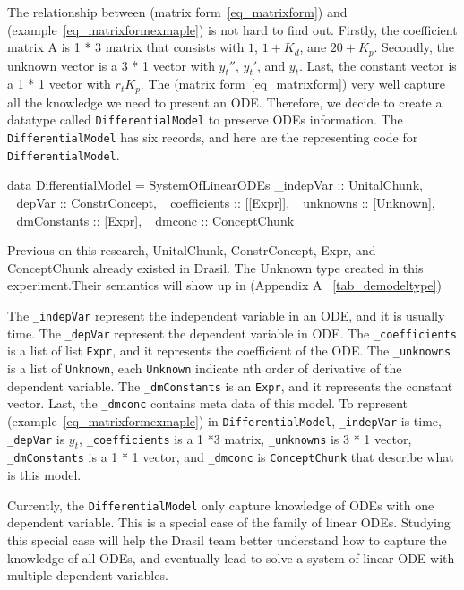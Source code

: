 The relationship between (matrix form~\ref{eq_matrixform}) and (example~\ref{eq_matrixformexmaple}) is not hard to find out. Firstly, the coefficient matrix A is 1 * 3 matrix that consists with $1$, $1 + K_d$, ane $20 + K_p$. Secondly, the unknown vector is a 3 * 1 vector with $y_t''$, $y_t'$, and $y_t$. Last, the constant vector is a 1 * 1 vector with $r_t K_p$. The (matrix form~\ref{eq_matrixform}) very well capture all the knowledge we need to present an ODE. Therefore, we decide to create a datatype called \verb|DifferentialModel| to preserve ODEs information. The \verb|DifferentialModel| has six records, and here are the representing code for \verb|DifferentialModel|.
\begin{haskell1}
data DifferentialModel = SystemOfLinearODEs {
	_indepVar :: UnitalChunk,
	_depVar :: ConstrConcept,
	_coefficients :: [[Expr]],
	_unknowns :: [Unknown],
	_dmConstants :: [Expr],
	_dmconc :: ConceptChunk
}
\end{haskell1}

Previous on this research, UnitalChunk, ConstrConcept, Expr, and ConceptChunk already existed in Drasil. The Unknown type created in this experiment.Their semantics will show up in (Appendix A ~\ref{tab_demodeltype})

The \verb|_indepVar| represent the independent variable in an ODE, and it is usually time. The \verb|_depVar| represent the dependent variable in ODE. The \verb|_coefficients| is a list of list \verb|Expr|, and it represents the coefficient of the ODE. The \verb|_unknowns| is a list of \verb|Unknown|, each \verb|Unknown| indicate nth order of derivative of the dependent variable. The \verb|_dmConstants| is an \verb|Expr|, and it represents the constant vector. Last, the \verb|_dmconc| contains meta data of this model. To represent (example~\ref{eq_matrixformexmaple}) in \verb|DifferentialModel|, \verb|_indepVar| is time, \verb|_depVar| is $y_t$, \verb|_coefficients| is a 1 *3 matrix, \verb|_unknowns| is 3 * 1 vector, \verb|_dmConstants| is a 1 * 1 vector, and \verb|_dmconc| is \verb|ConceptChunk| that describe what is this model.

Currently, the \verb|DifferentialModel| only capture knowledge of ODEs with one dependent variable. This is a special case of the family of linear ODEs. Studying this special case will help the Drasil team better understand how to capture the knowledge of all ODEs, and eventually lead to solve a system of linear ODE with multiple dependent variables.

